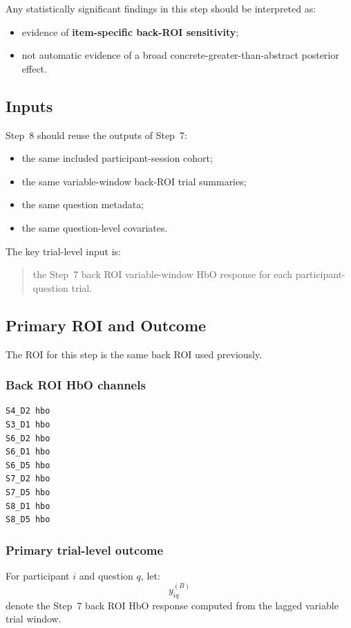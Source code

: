 Any statistically significant findings in this step should be interpreted as:
\begin{itemize}
    \item evidence of \textbf{item-specific back-ROI sensitivity};
    \item not automatic evidence of a broad concrete-greater-than-abstract posterior effect.
\end{itemize}

\subsection{Inputs}
Step~8 should reuse the outputs of Step~7:
\begin{itemize}
    \item the same included participant-session cohort;
    \item the same variable-window back-ROI trial summaries;
    \item the same question metadata;
    \item the same question-level covariates.
\end{itemize}

The key trial-level input is:
\begin{quote}
the Step~7 back ROI variable-window HbO response for each participant-question trial.
\end{quote}

\subsection{Primary ROI and Outcome}
The ROI for this step is the same back ROI used previously.

\subsubsection{Back ROI HbO channels}
\begin{verbatim}
S4_D2 hbo
S3_D1 hbo
S6_D2 hbo
S6_D1 hbo
S6_D5 hbo
S7_D2 hbo
S7_D5 hbo
S8_D1 hbo
S8_D5 hbo
\end{verbatim}

\subsubsection{Primary trial-level outcome}
For participant \(i\) and question \(q\), let:
\begin{equation}
y^{(B)}_{iq}
\end{equation}
denote the Step~7 back ROI HbO response computed from the lagged variable trial window.

